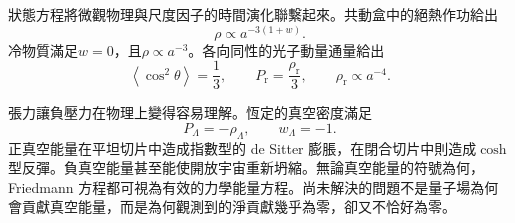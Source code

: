 狀態方程將微觀物理與尺度因子的時間演化聯繫起來。共動盒中的絕熱作功給出
\[
\rho\propto a^{-3(1+w)}.
\]
冷物質滿足\(w=0\)，且\(\rho\propto a^{-3}\)。各向同性的光子動量通量給出
\[
\left\langle\cos^2\theta\right\rangle=\frac13,
\qquad
P_{\mathrm r}=\frac{\rho_{\mathrm r}}{3},
\qquad
\rho_{\mathrm r}\propto a^{-4}.
\]

張力讓負壓力在物理上變得容易理解。恆定的真空密度滿足
\[
P_\Lambda=-\rho_\Lambda,
\qquad
w_\Lambda=-1.
\]
正真空能量在平坦切片中造成指數型的 de Sitter 膨脹，在閉合切片中則造成\(\cosh\)型反彈。負真空能量甚至能使開放宇宙重新坍縮。無論真空能量的符號為何，Friedmann 方程都可視為有效的力學能量方程。尚未解決的問題不是量子場為何會貢獻真空能量，而是為何觀測到的淨貢獻幾乎為零，卻又不恰好為零。
